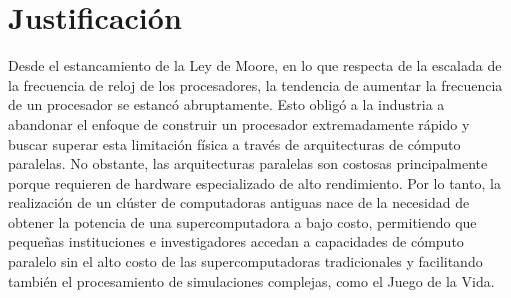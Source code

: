 \section{Justificación}
\label{section:justificacion}

Desde el estancamiento de la Ley de Moore, en lo que respecta de la escalada de la frecuencia de reloj de los procesadores, la tendencia de aumentar la frecuencia de un procesador se estancó abruptamente. Esto obligó a la industria a abandonar el enfoque de construir un procesador extremadamente rápido y buscar superar esta limitación física a través de arquitecturas de cómputo paralelas. No obstante, las arquitecturas paralelas son costosas principalmente porque requieren de hardware especializado de alto rendimiento. Por lo tanto, la realización de un clúster de computadoras antiguas nace de la necesidad de obtener la potencia de una supercomputadora a bajo costo, permitiendo que pequeñas instituciones e investigadores accedan a capacidades de cómputo paralelo sin el alto costo de las supercomputadoras tradicionales y facilitando también el procesamiento de simulaciones complejas, como el Juego de la Vida. 